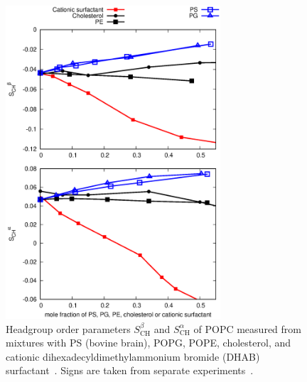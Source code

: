 \documentclass[journal=jpcbfk,manuscript=article]{achemso}
\begin{document}
\begin{figure}[t]
  \centering
  \includegraphics[width=8.0cm]{../Figs/HGorderparametersPCvsPEPSPGchol.eps}
  \caption{\label{HGorderparametersPCvsPEPSPGchol}
    Headgroup order parameters $S^\beta_\mathrm{CH}$ and $S^\alpha_\mathrm{CH}$ of POPC measured from mixtures with
    PS (bovine brain), POPG, POPE, cholesterol, and cationic dihexadecyldimethylammonium bromide (DHAB) surfactant~\cite{scherer87,scherer89,ferreira13}.
    Signs are taken from separate experiments~\cite{ollila16,ferreira16}.
  }
\end{figure}
\end{document}
